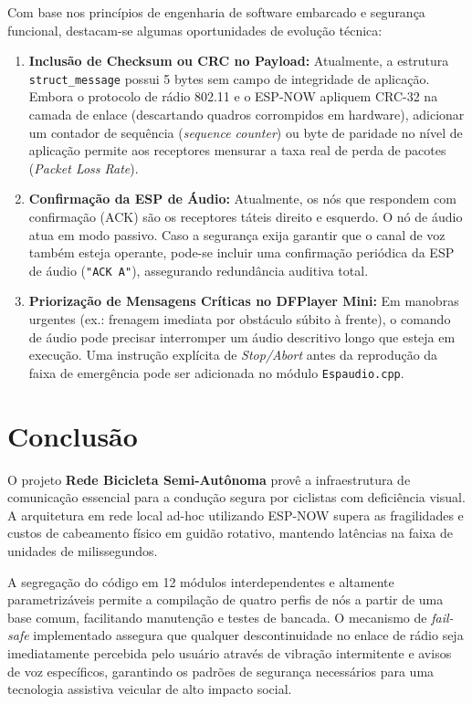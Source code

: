 \documentclass[12pt,a4paper]{article}
\begin{document}
Com base nos princípios de engenharia de software embarcado e segurança funcional, destacam-se algumas oportunidades de evolução técnica:
\begin{enumerate}
    \item \textbf{Inclusão de Checksum ou CRC no Payload:}
    Atualmente, a estrutura \texttt{struct\_message} possui 5 bytes sem campo de integridade de aplicação. Embora o protocolo de rádio 802.11 e o ESP-NOW apliquem CRC-32 na camada de enlace (descartando quadros corrompidos em hardware), adicionar um contador de sequência (\textit{sequence counter}) ou byte de paridade no nível de aplicação permite aos receptores mensurar a taxa real de perda de pacotes (\textit{Packet Loss Rate}).
    \item \textbf{Confirmação da ESP de Áudio:}
    Atualmente, os nós que respondem com confirmação (ACK) são os receptores táteis direito e esquerdo. O nó de áudio atua em modo passivo. Caso a segurança exija garantir que o canal de voz também esteja operante, pode-se incluir uma confirmação periódica da ESP de áudio (\texttt{"ACK A"}), assegurando redundância auditiva total.
    \item \textbf{Priorização de Mensagens Críticas no DFPlayer Mini:}
    Em manobras urgentes (ex.: frenagem imediata por obstáculo súbito à frente), o comando de áudio pode precisar interromper um áudio descritivo longo que esteja em execução. Uma instrução explícita de \textit{Stop/Abort} antes da reprodução da faixa de emergência pode ser adicionada no módulo \texttt{Espaudio.cpp}.
\end{enumerate}

\section{Conclusão}

O projeto \textbf{Rede Bicicleta Semi-Autônoma} provê a infraestrutura de comunicação essencial para a condução segura por ciclistas com deficiência visual. A arquitetura em rede local ad-hoc utilizando ESP-NOW supera as fragilidades e custos de cabeamento físico em guidão rotativo, mantendo latências na faixa de unidades de milissegundos.

A segregação do código em 12 módulos interdependentes e altamente parametrizáveis permite a compilação de quatro perfis de nós a partir de uma base comum, facilitando manutenção e testes de bancada. O mecanismo de \textit{fail-safe} implementado assegura que qualquer descontinuidade no enlace de rádio seja imediatamente percebida pelo usuário através de vibração intermitente e avisos de voz específicos, garantindo os padrões de segurança necessários para uma tecnologia assistiva veicular de alto impacto social.
\end{document}
